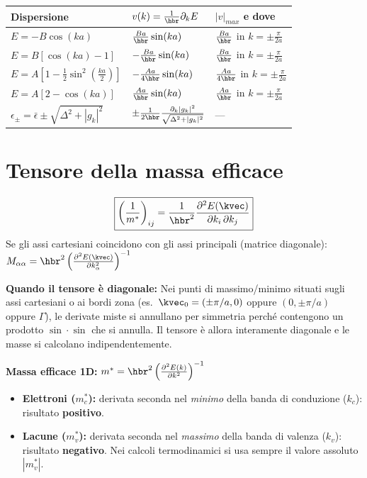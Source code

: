 \begin{center}
\renewcommand{\arraystretch}{1.6}
\begin{tabular}{l l l}
\toprule
Dispersione & $v(k)=\frac1\hbr\partial_kE$ & $|v|_{max}$ e dove \\
\midrule
$E = -B\cos(ka)$ & $\frac{Ba}{\hbr}\sin(ka)$ & $\frac{Ba}{\hbr}$ in $k=\pm\frac{\pi}{2a}$ \\
$E = B\left[\cos(ka)-1\right]$ & $-\frac{Ba}{\hbr}\sin(ka)$ & $\frac{Ba}{\hbr}$ in $k=\pm\frac{\pi}{2a}$ \\
$E = A\left[1-\frac12\sin^2\!\left(\frac{ka}{2}\right)\right]$ & $-\frac{Aa}{4\hbr}\sin(ka)$ & $\frac{Aa}{4\hbr}$ in $k=\pm\frac{\pi}{2a}$ \\
$E = A\left[2-\cos(ka)\right]$ & $\frac{Aa}{\hbr}\sin(ka)$ & $\frac{Aa}{\hbr}$ in $k=\pm\frac{\pi}{2a}$ \\
$\epsilon_\pm=\bar\epsilon\pm\sqrt{\Delta^2+|g_k|^2}$ & $\pm\frac{1}{2\hbr}\frac{\partial_k|g_k|^2}{\sqrt{\Delta^2+|g_k|^2}}$ & --- \\
\bottomrule
\end{tabular}
\end{center}

\section{Tensore della massa efficace}
\[ \boxed{\left(\frac{1}{m^*}\right)_{ij} = \frac{1}{\hbr^2}\frac{\partial^2 E(\kvec)}{\partial k_i\,\partial k_j}} \]
Se gli assi cartesiani coincidono con gli assi principali (matrice diagonale): $ M_{\alpha\alpha} = \hbr^2\left(\frac{\partial^2 E(\kvec)}{\partial k_\alpha^2}\right)^{-1}$

\noindent\textbf{Quando il tensore è diagonale:} Nei punti di massimo/minimo situati sugli assi cartesiani o ai bordi zona (es.\ $\kvec_0=(\pm\pi/a,0)$ oppure $(0,\pm\pi/a)$ oppure $\Gamma$), le derivate miste si annullano per simmetria perché contengono un prodotto $\sin\cdot\sin$ che si annulla. Il tensore è allora interamente diagonale e le masse si calcolano indipendentemente.

\vspace{0.3cm}
\noindent\textbf{Massa efficace 1D:} $ m^* = \hbr^2\left(\frac{\partial^2E(k)}{\partial k^2}\right)^{-1} $
\begin{itemize}
    \item \textbf{Elettroni ($m_c^*$):} derivata seconda nel \emph{minimo} della banda di conduzione ($k_c$): risultato \textbf{positivo}.
    \item \textbf{Lacune ($m_v^*$):} derivata seconda nel \emph{massimo} della banda di valenza ($k_v$): risultato \textbf{negativo}. Nei calcoli termodinamici si usa sempre il valore assoluto $|m_v^*|$.
\end{itemize}


